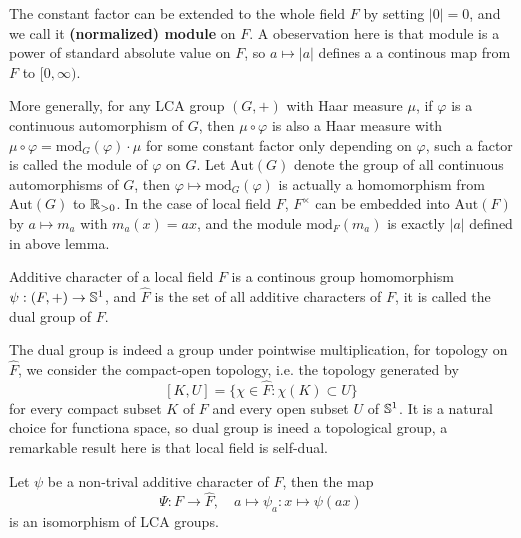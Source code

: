 The constant factor can be extended to the whole field \(F\) by setting \(|0| = 0\), and we call it \textbf{(normalized) module} on \(F\). A obeservation here is that module is a power of standard absolute value on \(F\), so \(a \mapsto |a|\) defines a a continous map from \(F\) to \([0,\infty)\).

\begin{remark}
    More generally, for any LCA group \((G,+)\) with Haar measure \(\mu\), if \(\varphi\) is a continuous automorphism of \(G\), then \(\mu \circ \varphi\) is also a Haar measure with \(\mu\circ \varphi = \mathrm{mod}_G(\varphi) \cdot \mu\) for some constant factor only depending on \(\varphi\), such a factor is called the module of \(\varphi\) on \(G\). Let \(\mathrm{Aut}(G)\) denote the group of all continuous automorphisms of \(G\), then \(\varphi \mapsto \mathrm{mod}_G(\varphi)\) is actually a homomorphism from \(\mathrm{Aut}(G)\) to \(\mathbb{R}_{>0}\). In the case of local field \(F\), \(F^\times\) can be embedded into \(\mathrm{Aut}(F)\) by \(a \mapsto m_a\) with \(m_a(x) = ax\), and the module \(\mathrm{mod}_F(m_a)\) is exactly \(|a|\) defined in above lemma.
\end{remark}



\begin{definition}
    Additive character of a local field \(F\) is a continous group homomorphism \(\psi: (F,+) \to \mathbb{S}^1\), and \(\hat{F}\) is the set of all additive characters of \(F\), it is called the dual group of \(F\).
\end{definition}

The dual group is indeed a group under pointwise multiplication, for topology on \(\hat{F}\), we consider the compact-open topology, i.e. the topology generated by
\[[K,U]= \{\chi \in \hat{F} : \chi(K) \subset U\}\]
for every compact subset \(K\) of \(F\) and every open subset \(U\) of \(\mathbb{S}^1\). It is a natural choice for functiona space, so dual group is ineed a topological group, a remarkable result here is that local field is self-dual.

\begin{theorem} \label{local-field-selfdual}
    Let \(\psi\) be a non-trival additive character of \(F\), then the map
    \[\Psi: F \to \hat{F}, \quad a \mapsto \psi_a :x \mapsto \psi(ax)\]
    is an isomorphism of LCA groups.
\end{theorem}

